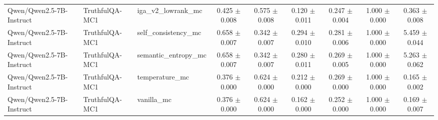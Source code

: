 \begin{table}[t]
\begin{tabular}{lllcccccc}
Qwen/Qwen2.5-7B-Instruct & TruthfulQA-MC1 & iga\_v2\_lowrank\_mc & 0.425 $\pm$ 0.008 & 0.575 $\pm$ 0.008 & 0.120 $\pm$ 0.011 & 0.247 $\pm$ 0.004 & 1.000 $\pm$ 0.000 & 0.363 $\pm$ 0.008 \\
Qwen/Qwen2.5-7B-Instruct & TruthfulQA-MC1 & self\_consistency\_mc & 0.658 $\pm$ 0.007 & 0.342 $\pm$ 0.007 & 0.294 $\pm$ 0.010 & 0.281 $\pm$ 0.006 & 1.000 $\pm$ 0.000 & 5.459 $\pm$ 0.044 \\
Qwen/Qwen2.5-7B-Instruct & TruthfulQA-MC1 & semantic\_entropy\_mc & 0.658 $\pm$ 0.007 & 0.342 $\pm$ 0.007 & 0.280 $\pm$ 0.011 & 0.269 $\pm$ 0.005 & 1.000 $\pm$ 0.000 & 5.263 $\pm$ 0.062 \\
Qwen/Qwen2.5-7B-Instruct & TruthfulQA-MC1 & temperature\_mc & 0.376 $\pm$ 0.000 & 0.624 $\pm$ 0.000 & 0.212 $\pm$ 0.000 & 0.269 $\pm$ 0.000 & 1.000 $\pm$ 0.000 & 0.165 $\pm$ 0.002 \\
Qwen/Qwen2.5-7B-Instruct & TruthfulQA-MC1 & vanilla\_mc & 0.376 $\pm$ 0.000 & 0.624 $\pm$ 0.000 & 0.162 $\pm$ 0.000 & 0.252 $\pm$ 0.000 & 1.000 $\pm$ 0.000 & 0.169 $\pm$ 0.007 \\
\bottomrule
\end{tabular}
\end{table}
